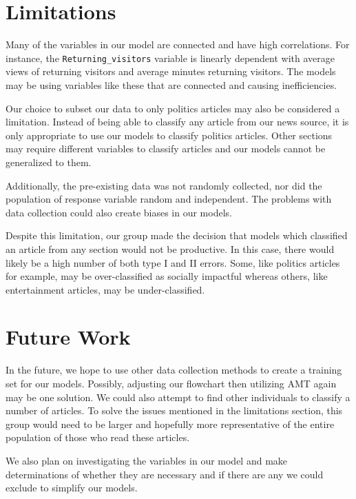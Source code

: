 \documentclass[10pt,letterpaper]{article}
\begin{document}
\hypertarget{limitations}{%
\section{Limitations}\label{limitations}}

Many of the variables in our model are connected and have high
correlations. For instance, the \texttt{Returning\_visitors} variable is
linearly dependent with average views of returning visitors and average
minutes returning visitors. The models may be using variables like these
that are connected and causing inefficiencies.

Our choice to subset our data to only politics articles may also be
considered a limitation. Instead of being able to classify any article
from our news source, it is only appropriate to use our models to
classify politics articles. Other sections may require different
variables to classify articles and our models cannot be generalized to
them.

Additionally, the pre-existing data was not randomly collected, nor did
the population of response variable random and independent. The problems
with data collection could also create biases in our models.

Despite this limitation, our group made the decision that models which
classified an article from any section would not be productive. In this
case, there would likely be a high number of both type I and II errors.
Some, like politics articles for example, may be over-classified as
socially impactful whereas others, like entertainment articles, may be
under-classified.

\hypertarget{future-work}{%
\section{Future Work}\label{future-work}}

In the future, we hope to use other data collection methods to create a
training set for our models. Possibly, adjusting our flowchart then
utilizing AMT again may be one solution. We could also attempt to find
other individuals to classify a number of articles. To solve the issues
mentioned in the limitations section, this group would need to be larger
and hopefully more representative of the entire population of those who
read these articles.

We also plan on investigating the variables in our model and make
determinations of whether they are necessary and if there are any we
could exclude to simplify our models.
\end{document}
